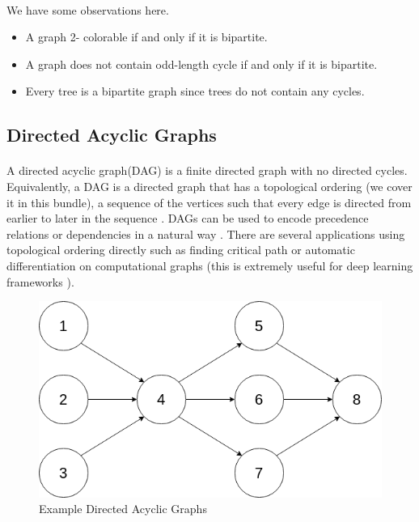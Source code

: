 \documentclass[12pt]{article}
\begin{document}
\paragraph{} We have some observations here.
\begin{itemize}
\item A graph 2- colorable if and only if it is bipartite. 
\item A graph does not contain odd-length cycle if and only if it is bipartite.
\item Every tree is a bipartite graph since trees do not contain any cycles. 
\end{itemize}

\newpage
\subsection{Directed Acyclic Graphs}
\paragraph{}
A directed acyclic graph(DAG) is a finite directed graph with no directed cycles. Equivalently, a DAG is a directed graph that has a topological ordering (we cover it in this bundle), a sequence of the vertices such that every edge is directed from earlier to later in the sequence \cite{2}. DAGs can be used to encode precedence relations or dependencies in a natural way \cite{4}. There are several applications using topological ordering directly such as finding  critical path or automatic differentiation on computational graphs (this is extremely useful for deep learning frameworks \cite{5}).  




\begin{figure}[h!]
\begin{center}
  \includegraphics[scale = .7]{dag.png}
  \end{center}
\caption{Example Directed Acyclic Graphs}
  \label{fig}
\end{figure}
\end{document}
